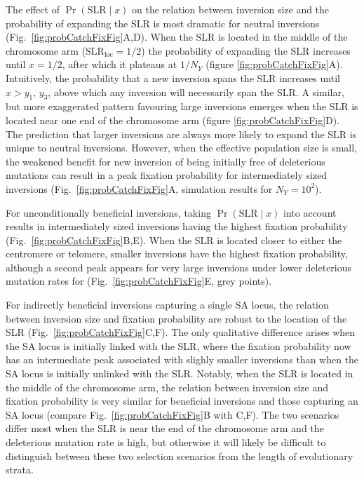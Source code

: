 \documentclass{article}[12pt]
\begin{document}
The effect of $\Pr(\text{SLR} \mid x)$ on the relation between inversion size and the probability of expanding the SLR is most dramatic for neutral inversions (Fig.~\ref{fig:probCatchFixFig}A,D). When the SLR is located in the middle of the chromosome arm ($\text{SLR}_{\text{loc}} = 1/2$) the probability of expanding the SLR increases until $x = 1/2$, after which it plateaus at $1/N_Y$ (figure \ref{fig:probCatchFixFig}A). Intuitively, the probability that a new inversion spans the SLR increases until $x > y_1,\,y_3$, above which any inversion will necessarily span the SLR. A similar, but more exaggerated pattern favouring large inversions emerges when the SLR is located near one end of the chromosome arm (figure \ref{fig:probCatchFixFig}D). The prediction that larger inversions are always more likely to expand the SLR is unique to neutral inversions. However, when the effective population size is small, the weakened benefit for new inversion of being initially free of deleterious mutations can result in a peak fixation probability for intermediately sized inversions (Fig.~\ref{fig:probCatchFixFig}A, simulation results for $N_Y = 10^2$).

For unconditionally beneficial inversions, taking $\Pr(\text{SLR} \mid x)$ into account results in intermediately sized inversions having the highest fixation probability (Fig.~\ref{fig:probCatchFixFig}B,E). When the SLR is located closer to either the centromere or telomere, smaller inversions have the highest fixation probability, although a second peak appears for very large inversions under lower deleterious mutation rates for  (Fig.~\ref{fig:probCatchFixFig}E, grey points).

For indirectly beneficial inversions capturing a single SA locus, the relation between inversion size and fixation probability are robust to the location of the SLR (Fig.~\ref{fig:probCatchFixFig}C,F). The only qualitative difference arises when the SA locus is initially linked with the SLR, where the fixation probability now has an intermediate peak associated with slighly smaller inversions than when the SA locus is initially unlinked with the SLR. Notably, when the SLR is located in the middle of the chromosome arm, the relation between inversion size and fixation probability is very similar for beneficial inversions and those capturing an SA locus (compare Fig.~\ref{fig:probCatchFixFig}B with C,F). The two scenarios differ most when the SLR is near the end of the chromosome arm and the deleterious mutation rate is high, but otherwise it will likely be difficult to distinguish between these two selection scenarios from the length of evolutionary strata.  \vspace{12pt}
\end{document}
